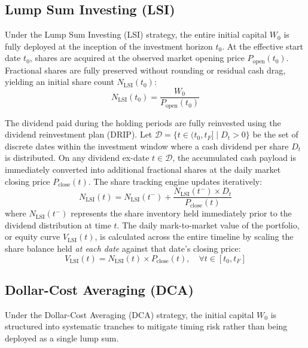 \documentclass[11pt,a4paper]{article}
\begin{document}
\subsection{Lump Sum Investing (LSI)}

Under the Lump Sum Investing (LSI) strategy, the entire initial capital $W_0$ is fully deployed at the inception of the investment horizon $t_0$.  At the effective start date $t_0$, shares are acquired at the observed market opening price $P_{\text{open}}(t_0)$. Fractional shares are fully preserved without rounding or residual cash drag, yielding an initial share count $N_{\text{LSI}}(t_0)$:
\begin{equation}
N_{\text{LSI}}(t_0) = \frac{W_0}{P_{\text{open}}(t_0)}
\end{equation}

The dividend paid during the holding periods are fully reinvested using the dividend reinvestment plan (DRIP). Let $\mathcal{D} = \{t \in (t_0, t_F] \mid D_t > 0\}$ be the set of discrete dates within the investment window where a cash dividend per share $D_t$ is distributed. On any dividend ex-date $t \in \mathcal{D}$, the accumulated cash payload is immediately converted into additional fractional shares at the daily market closing price $P_{\text{close}}(t)$. The share tracking engine updates iteratively:
\begin{equation}
N_{\text{LSI}}(t) = N_{\text{LSI}}(t^-) + \frac{N_{\text{LSI}}(t^-) \times D_t}{P_{\text{close}}(t)}
\end{equation}
where $N_{\text{LSI}}(t^-)$ represents the share inventory held immediately prior to the dividend distribution at time $t$. The daily mark-to-market value of the portfolio, or equity curve $V_{\text{LSI}}(t)$, is calculated across the entire timeline by scaling the share balance held \emph{at each date} against that date's closing price:
\begin{equation}
V_{\text{LSI}}(t) = N_{\text{LSI}}(t) \times P_{\text{close}}(t), \quad \forall t \in [t_0, t_F]
\end{equation}

\subsection{Dollar-Cost Averaging (DCA)}

Under the Dollar-Cost Averaging (DCA) strategy, the initial capital $W_0$ is structured into systematic tranches to mitigate timing risk rather than being deployed as a single lump sum.
\end{document}

